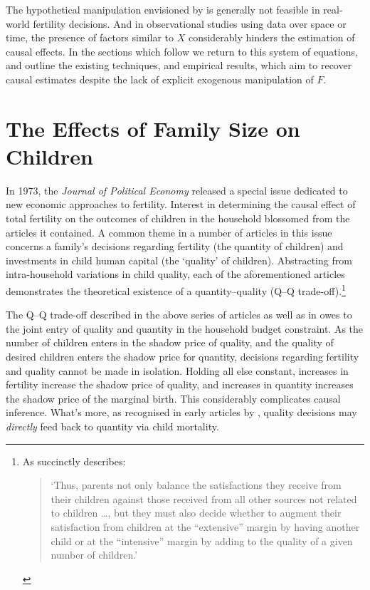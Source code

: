 The hypothetical manipulation envisioned by \citeauthor{Haavelmo1943} is 
generally not feasible in real-world fertility decisions. And in observational
studies using data over space or time, the presence of factors similar to $X$
considerably hinders the estimation of causal effects.  In the sections which
follow we return to this system of equations, and outline the existing 
techniques, and empirical results, which aim to recover causal estimates despite
the lack of explicit exogenous manipulation of $F$.

\section{The Effects of Family Size on Children}
In 1973, the \emph{Journal of Political Economy} released a special issue 
dedicated to new economic approaches to fertility.  Interest in determining
the causal effect of total fertility on the outcomes of children in the 
household blossomed from the articles it contained.  A common theme in a number 
of articles in this issue \citep{BeckerLewis1973, DeTray1973, Willis1973} 
concerns a family's decisions regarding fertility (the quantity of children) 
and investments in child human capital (the `quality' of children). Abstracting 
from intra-household variations in child quality, each of the aforementioned
articles demonstrates the theoretical existence of a quantity--quality
(Q--Q trade-off).\footnote{As \citet{Willis1973} succinctly describes:
\begin{quote}
`Thus, parents not only balance the satisfactions they receive from their
children against those received from all other sources not related to 
children \ldots, but they must also decide whether to augment their 
satisfaction from children at the ``extensive'' margin by having another
child or at the ``intensive'' margin by adding to the quality of a given
number of children.'
\end{quote}
}

The Q--Q trade-off described in the above series of articles as well as in
\citet{BeckerTomes1976,BeckerTomes1986} owes to the joint entry of quality and 
quantity in the household budget constraint.  As the number of children 
enters in the shadow price of quality, and the quality of desired children 
enters the shadow price for quantity, decisions regarding fertility and quality 
cannot be made in isolation.  Holding all else constant, increases in fertility 
increase the shadow price of quality, and increases in quantity increases the
shadow price of the marginal birth. This considerably complicates causal 
inference. What's more, as recognised in early articles by \citet{%
BenPorathWelch1972,BenPorath1976}, quality decisions may \emph{directly} feed 
back to quantity via child mortality.

